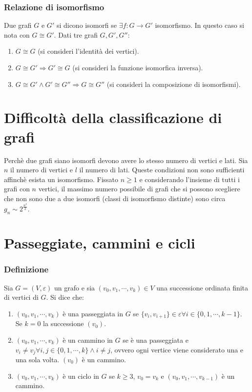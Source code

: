 \subsubsection{Relazione di isomorfismo}
Due grafi $G$ e $G'$ si dicono isomorfi se $\exists f:G\rightarrow G'$ isomorfismo. In questo caso si nota con $G\cong G'$. Dati tre grafi $G,G',G''$:
\begin{enumerate}
\item $G\cong G$ (si consideri l'identit\`a dei vertici).
\item $G\cong G'\Rightarrow G'\cong G$ (si consideri la funzione isomorfica inversa).
\item $G\cong G'\wedge G'\cong G''\Rightarrow G\cong G''$ (si consideri la composizione di isomorfismi).
\end{enumerate}
\section{Difficolt\`a della classificazione di grafi}
Perch\`e due grafi siano isomorfi devono avere lo stesso numero di vertici e lati. Sia $n$ il numero di vertici e $l$ il numero di lati. Queste condizioni non sono sufficienti 
affinch\`e esista un isomorfismo. Fissato $n\ge 1$ e considerando l'insieme di tutti i grafi con $n$ vertici, il massimo numero possibile di grafi che si possono scegliere che 
non sono due a due isomorfi (classi di isomorfismo distinte) sono circa $g_n\sim 2^{\frac{n^2}{2}}$. 
\section{Passeggiate, cammini e cicli}
\subsubsection{Definizione}
Sia $G=(V,\varepsilon)$ un grafo e sia $(v_0,v_1,\cdots, v_k)\in V$ una successione ordinata finita di vertici di $G$. Si dice che:
\begin{enumerate}
\item $(v_0,v_1,\cdots, v_k)$ \`e una passeggiata in $G$ se $\{v_i,v_{i+1}\}\in\varepsilon\forall i\in\{0,1,\cdots, k-1\}$. Se $k=0$ la successione $(v_0)$.
\item $(v_0,v_1,\cdots, v_k)$ \`e un cammino in $G$ se \`e una passeggiata e $v_i\neq v_j\forall i,j\in\{0,1,\cdots, k\}\wedge i\neq j$, ovvero ogni vertice viene considerato 
una e una sola volta. $(v_0)$ \`e un cammino.
\item $(v_0,v_1,\cdots, v_k)$ \`e un ciclo in $G$ se $k\ge 3$, $v_0=v_k$ e $(v_0,v_1,\cdots, v_{k-1})$ \`e un cammino. 
\end{enumerate}
